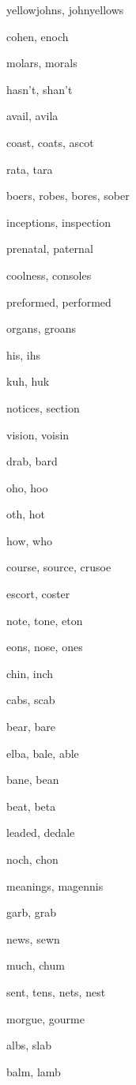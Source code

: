     \item yellowjohns, johnyellows
    \item cohen, enoch
    \item molars, morals
    \item hasn't, shan't
    \item avail, avila
    \item coast, coats, ascot
    \item rata, tara
    \item boers, robes, bores, sober
    \item inceptions, inspection
    \item prenatal, paternal
    \item coolness, consoles
    \item preformed, performed
    \item organs, groans
    \item his, ihs
    \item kuh, huk
    \item notices, section
    \item vision, voisin
    \item drab, bard
    \item oho, hoo
    \item oth, hot
    \item how, who
    \item course, source, crusoe
    \item escort, coster
    \item note, tone, eton
    \item eons, nose, ones
    \item chin, inch
    \item cabs, scab
    \item bear, bare
    \item elba, bale, able
    \item bane, bean
    \item beat, beta
    \item leaded, dedale
    \item noch, chon
    \item meanings, magennis
    \item garb, grab
    \item news, sewn
    \item much, chum
    \item sent, tens, nets, nest
    \item morgue, gourme
    \item albs, slab
    \item balm, lamb
